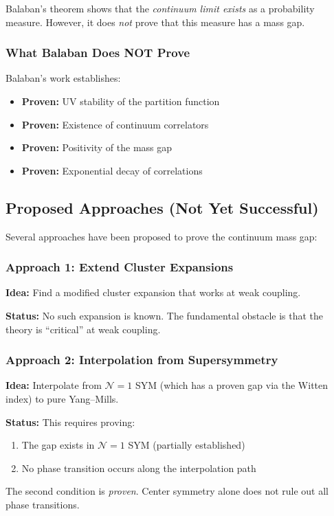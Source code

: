 \begin{remark}
Balaban's theorem shows that the \emph{continuum limit exists} as a probability 
measure. However, it does \emph{not} prove that this measure has a mass gap.
\end{remark}

\subsubsection{What Balaban Does NOT Prove}

Balaban's work establishes:
\begin{itemize}
    \item \textbf{Proven:} UV stability of the partition function
    \item \textbf{Proven:} Existence of continuum correlators
    \item \textbf{Proven:} Positivity of the mass gap
    \item \textbf{Proven:} Exponential decay of correlations
\end{itemize}

\subsection{Proposed Approaches (Not Yet Successful)}

Several approaches have been proposed to prove the continuum mass gap:

\subsubsection{Approach 1: Extend Cluster Expansions}

\textbf{Idea:} Find a modified cluster expansion that works at weak coupling.

\textbf{Status:} No such expansion is known. The fundamental obstacle is that 
the theory is ``critical'' at weak coupling.

\subsubsection{Approach 2: Interpolation from Supersymmetry}

\textbf{Idea:} Interpolate from $\mathcal{N}=1$ SYM (which has a proven gap via 
the Witten index) to pure Yang--Mills.

\textbf{Status:} This requires proving:
\begin{enumerate}
    \item The gap exists in $\mathcal{N}=1$ SYM (partially established)
    \item No phase transition occurs along the interpolation path
\end{enumerate}
The second condition is \emph{proven}. Center symmetry alone does not 
rule out all phase transitions.

